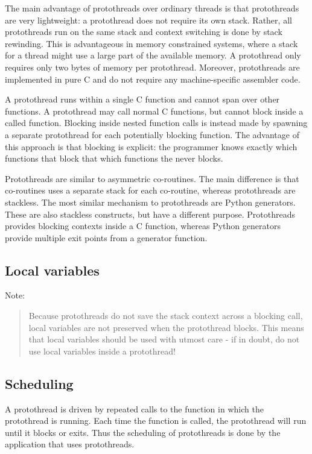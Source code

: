 \documentclass[12pt]{article}
\begin{document}
\begin{CJK}{UTF8}{bsmi}
The main advantage of protothreads over ordinary threads is that protothreads are very lightweight: a protothread does not require its own stack. Rather, all protothreads run on the same stack and context switching is done by stack rewinding. This is advantageous in memory constrained systems, where a stack for a thread might use a large part of the available memory. A protothread only requires only two bytes of memory per protothread. Moreover, protothreads are implemented in pure C and do not require any machine-specific assembler code.

A protothread runs within a single C function and cannot span over other functions. A protothread may call normal C functions, but cannot block inside a called function. Blocking inside nested function calls is instead made by spawning a separate protothread for each potentially blocking function. The advantage of this approach is that blocking is explicit: the programmer knows exactly which functions that block that which functions the never blocks.

Protothreads are similar to asymmetric co-routines. The main difference is that co-routines uses a separate stack for each co-routine, whereas protothreads are stackless. The most similar mechanism to protothreads are Python generators. These are also stackless constructs, but have a different purpose. Protothreads provides blocking contexts inside a C function, whereas Python generators provide multiple exit points from a generator function.


\subsection{Local variables}

Note:
\begin{quote}
Because protothreads do not save the stack context across a blocking call, local variables are not preserved when the protothread blocks. This means that local variables should be used with utmost care - if in doubt, do not use local variables inside a protothread!
\end{quote}

\subsection{Scheduling}

A protothread is driven by repeated calls to the function in which the protothread is running. Each time the function is called, the protothread will run until it blocks or exits. Thus the scheduling of protothreads is done by the application that uses protothreads.


\end{CJK}
\end{document}
